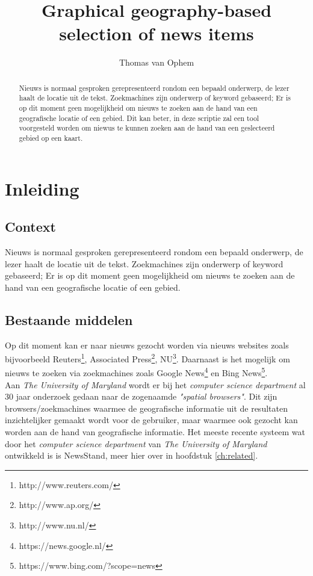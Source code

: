 \documentclass[twoside,openright]{uva-bachelor-thesis}
\title{Graphical geography-based \\selection of news items}
\author{Thomas van Ophem}
\begin{document}
\maketitle

\begin{abstract}
	Nieuws is normaal gesproken gerepresenteerd rondom een bepaald onderwerp, de lezer haalt de locatie uit de tekst. Zoekmachines zijn onderwerp of keyword gebaseerd; Er is op dit moment geen mogelijkheid om nieuws te zoeken aan de hand van een geografische locatie of een gebied. Dit kan beter, in deze scriptie zal een tool voorgesteld worden om niewus te kunnen zoeken aan de hand van een geslecteerd gebied op een kaart. %
\end{abstract}

\tableofcontents

\chapter{Inleiding}
	\section{Context}
		Nieuws is normaal gesproken gerepresenteerd rondom een bepaald onderwerp, de lezer haalt de locatie uit de tekst. Zoekmachines zijn onderwerp of keyword gebaseerd; Er is op dit moment geen mogelijkheid om nieuws te zoeken aan de hand van een geografische locatie of een gebied.
	\section{Bestaande middelen}
		Op dit moment kan er naar nieuws gezocht worden via  nieuws websites zoals bijvoorbeeld Reuters\footnote{http://www.reuters.com/}, Associated Press\footnote{http://www.ap.org/}, NU\footnote{http://www.nu.nl/}. Daarnaast is het mogelijk om nieuws te zoeken via zoekmachines zoals Google News\footnote{https://news.google.nl/} en Bing News\footnote{https://www.bing.com/?scope=news}.
		\\[0.5cm]
		Aan \textit{The University of Maryland} wordt er bij het \textit{computer science department} al 30 jaar onderzoek gedaan naar de zogenaamde \textit{"spatial browsers"}. Dit zijn browsers/zoekmachines waarmee de geografische informatie uit de resultaten inzichtelijker gemaakt wordt voor de gebruiker, maar waarmee ook gezocht kan worden aan de hand van geografische informatie. Het meeste recente systeem wat door het \textit{computer science department} van \textit{The University of Maryland} ontwikkeld is is NewsStand, meer hier over in hoofdstuk \ref{ch:related}.
\end{document}
